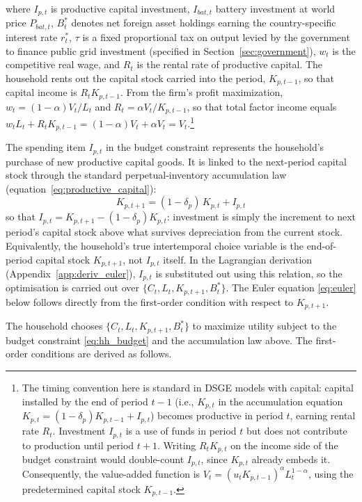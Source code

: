 \documentclass[12pt, a4paper]{article}
\begin{document}
where $I_{p,t}$ is productive capital investment, $I_{bat,t}$ battery investment at world price $P_{bat,t}$, $B^*_t$ denotes net foreign asset holdings earning the country-specific interest rate $r^*_t$, $\tau$ is a fixed proportional tax on output levied by the government to finance public grid investment (specified in Section~\ref{sec:government}), $w_t$ is the competitive real wage, and $R_t$ is the rental rate of productive capital. The household rents out the capital stock carried into the period, $K_{p,t-1}$, so that capital income is $R_t K_{p,t-1}$. From the firm's profit maximization, $w_t = (1-\alpha)V_t/L_t$ and $R_t = \alpha V_t / K_{p,t-1}$, so that total factor income equals $w_t L_t + R_t K_{p,t-1} = (1-\alpha)V_t + \alpha V_t = V_t$.\footnote{\label{fn:timing_convention}The timing convention here is standard in DSGE models with capital: capital installed by the end of period $t-1$ (i.e., $K_{p,t}$ in the accumulation equation $K_{p,t} = (1-\delta_p)K_{p,t-1} + I_{p,t}$) becomes productive in period $t$, earning rental rate $R_t$. Investment $I_{p,t}$ is a use of funds in period $t$ but does not contribute to production until period $t+1$. Writing $R_t K_{p,t}$ on the income side of the budget constraint would double-count $I_{p,t}$, since $K_{p,t}$ already embeds it. Consequently, the value-added function is $V_t = (u_t K_{p,t-1})^\alpha L_t^{1-\alpha}$, using the predetermined capital stock $K_{p,t-1}$.}

The spending item $I_{p,t}$ in the budget constraint represents the household's purchase of new productive capital goods. It is linked to the next-period capital stock through the standard perpetual-inventory accumulation law (equation~\eqref{eq:productive_capital}):
\begin{equation*}
K_{p,t+1} = (1-\delta_p)\,K_{p,t} + I_{p,t}
\end{equation*}
\noindent so that $I_{p,t} = K_{p,t+1} - (1-\delta_p)K_{p,t}$: investment is simply the increment to next period's capital stock above what survives depreciation from the current stock. Equivalently, the household's true intertemporal choice variable is the end-of-period capital stock $K_{p,t+1}$, not $I_{p,t}$ itself. In the Lagrangian derivation (Appendix~\ref{app:deriv_euler}), $I_{p,t}$ is substituted out using this relation, so the optimisation is carried out over $\{C_t, L_t, K_{p,t+1}, B^*_t\}$. The Euler equation \eqref{eq:euler} below follows directly from the first-order condition with respect to $K_{p,t+1}$.

The household chooses $\{C_t, L_t, K_{p,t+1}, B^*_t\}$ to maximize utility subject to the budget constraint \eqref{eq:hh_budget} and the accumulation law above. The first-order conditions are derived as follows.
\end{document}
